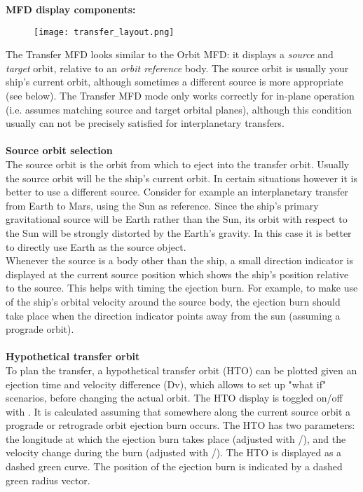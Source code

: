 \documentclass[Orbiter User Manual.tex]{subfiles}
\begin{document}
\noindent
\textbf{MFD display components:}

\begin{figure}[H]
  \centering
  \texttt{[image: transfer\_layout.png]}
\end{figure}

\noindent
The Transfer MFD looks similar to the Orbit MFD: it displays a \textit{source} and \textit{target} orbit, relative to an \textit{orbit reference} body. The source orbit is usually your ship's current orbit, although sometimes a different source is more appropriate (see below). The Transfer MFD mode only works correctly for in-plane operation (i.e. assumes matching source and target orbital planes), although this condition usually can not be precisely satisfied for interplanetary transfers.\\
\\
\textbf{Source orbit selection}\\
The source orbit is the orbit from which to eject into the transfer orbit. Usually the source orbit will be the ship's current orbit. In certain situations however it is better to use a different source. Consider for example an interplanetary transfer from Earth to Mars, using the Sun as reference. Since the ship's primary gravitational source will be Earth rather than the Sun, its orbit with respect to the Sun will be strongly distorted by the Earth's gravity. In this case it is better to directly use Earth as the source object.\\
Whenever the source is a body other than the ship, a small direction indicator is displayed at the current source position which shows the ship's position relative to the source. This helps with timing the ejection burn. For example, to make use of the ship's orbital velocity around the source body, the ejection burn should take place when the direction indicator points away from the sun (assuming a prograde orbit).\\
\\
\textbf{Hypothetical transfer orbit}\\
To plan the transfer, a hypothetical transfer orbit (HTO) can be plotted given an ejection time and velocity difference (Dv), which allows to set up "what if" scenarios, before changing the actual orbit. The HTO display is toggled on/off with \Shift{}. It is calculated assuming that somewhere along the current source orbit a prograde or retrograde orbit ejection burn occurs. The HTO has two parameters: the longitude at which the ejection burn takes place (adjusted with \Shift \keystroke{,}/), and the velocity change during the burn (adjusted with \Shift \keystroke{-}/\keystroke{=}). The HTO is displayed as a dashed green curve. The position of the ejection burn is indicated by a dashed green radius vector.\\
\end{document}
